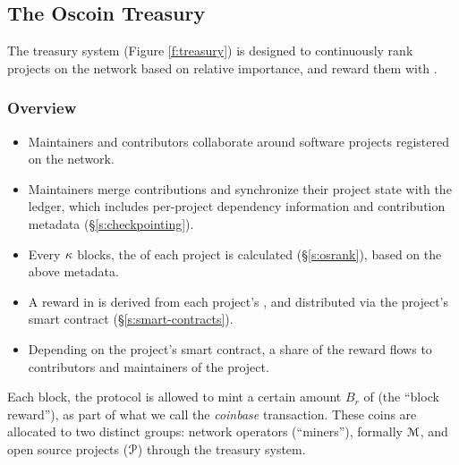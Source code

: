 \begin{figure*}[!ht]
    \par\medskip\noindent\minipage{\linewidth}
    \centering
    
    \caption{The \Oscoin{} Treasury System\label{f:treasury}}
    \endminipage\par\medskip
\end{figure*}

\subsection{The Oscoin Treasury}
\label{s:treasury}

The treasury system (Figure \ref{f:treasury}) is designed to continuously
rank projects on the network based on relative importance, and reward them with
\oscoin{}.

\subsubsection{Overview}

\begin{itemize}
    \item Maintainers and contributors collaborate around software projects
        registered on the network.
    \item Maintainers merge contributions and synchronize their project state
        with the ledger, which includes per-project dependency information and
        contribution metadata (\S\ref{s:checkpointing}).
    \item Every $\kappa$ blocks, the \osrank{} of each project is calculated
        (\S\ref{s:osrank}), based on the above metadata.
    \item A reward in \oscoin{} is derived from each project's \osrank{},
        and distributed via the project's smart contract (\S\ref{s:smart-contracts}).
    \item Depending on the project's smart contract, a share of the reward flows
        to contributors and maintainers of the project.
\end{itemize}

\medskip

\noindent Each block, the protocol is allowed to mint a certain amount $B_r$ of \oscoin{}
(the ``block reward''), as part of what we call the \emph{coinbase}
transaction. These coins are allocated to two distinct groups: network
operators (``miners''), formally $\mathcal{M}$, and open source projects ($\mathcal{P}$)
through the treasury system.

